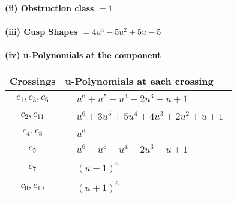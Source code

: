 \documentclass[1p]{elsarticle_modified}
\theoremstyle{definition}
\begin{document}
\flushleft \textbf{(ii) Obstruction class $= 1$}\\~\\
\flushleft \textbf{(iii) Cusp Shapes $= 4 u^4-5 u^2+5 u-5$}\\~\\
\newpage\renewcommand{\arraystretch}{1}
\flushleft \textbf{(iv) u-Polynomials at the component}\newline \\
\begin{tabular}{m{50pt}|m{274pt}}
Crossings & \hspace{64pt}u-Polynomials at each crossing \\
\hline $$\begin{aligned}c_{1},c_{3},c_{6}\end{aligned}$$&$\begin{aligned}
&u^6+u^5- u^4-2 u^3+u+1
\end{aligned}$\\
\hline $$\begin{aligned}c_{2},c_{11}\end{aligned}$$&$\begin{aligned}
&u^6+3 u^5+5 u^4+4 u^3+2 u^2+u+1
\end{aligned}$\\
\hline $$\begin{aligned}c_{4},c_{8}\end{aligned}$$&$\begin{aligned}
&u^6
\end{aligned}$\\
\hline $$\begin{aligned}c_{5}\end{aligned}$$&$\begin{aligned}
&u^6- u^5- u^4+2 u^3- u+1
\end{aligned}$\\
\hline $$\begin{aligned}c_{7}\end{aligned}$$&$\begin{aligned}
&(u-1)^6
\end{aligned}$\\
\hline $$\begin{aligned}c_{9},c_{10}\end{aligned}$$&$\begin{aligned}
&(u+1)^6
\end{aligned}$\\
\hline
\end{tabular}\\~\\
\end{document}
